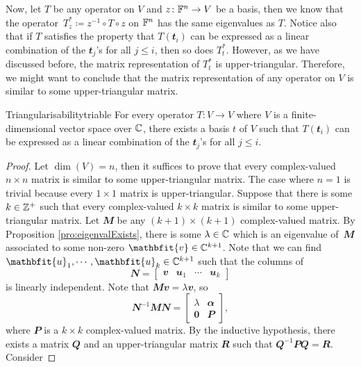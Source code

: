 \documentclass[math]{amznotes}
\theoremstyle{remark}
\newcommand{\zero}{\mathbf{0}}
\begin{document}
Now, let $T$ be any operator on $V$ and $z \colon \mathbb{F}^n \to V$ be a basis, then we know that the operator~$T^*_z \coloneqq z^{-1} \circ T \circ z$ on $\mathbb{F}^n$ has the same eigenvalues as $T$. Notice also that if $T$ satisfies the property that $T(\mathbfit{t}_i)$ can be expressed as a linear combination of the $\mathbfit{t}_j$'s for all $j \leq i$, then so does $T^*_t$. However, as we have discussed before, the matrix representation of $T^*_t$ is upper-triangular. Therefore, we might want to conclude that the matrix representation of any operator on $V$ is similar to some upper-triangular matrix.
\begin{thmbox}{Triangularisability}{triable}
    For every operator $T \colon V \to V$ where $V$ is a finite-dimensional vector space over $\mathbb{C}$, there exists a basis $t$ of $V$ such that $T(\mathbfit{t}_i)$ can be expressed as a linear combination of the $\mathbfit{t}_j$'s for all $j \leq i$.
    \tcblower
    \begin{proof}
        Let $\dim(V) = n$, then it suffices to prove that every complex-valued $n \times n$ matrix is similar to some upper-triangular matrix. The case where $n = 1$ is trivial because every $1 \times 1$ matrix is upper-triangular. Suppose that there is some $k \in \mathbb{Z}^+$ such that every complex-valued $k \times k$ matrix is similar to some upper-triangular matrix. Let $\mathbfit{M}$ be any $(k + 1) \times (k + 1)$ complex-valued matrix. By Proposition \ref{pro:eigenvalExists}, there is some $\lambda \in \mathbb{C}$ which is an eigenvalue of~$\mathbfit{M}$ associated to some non-zero $\mathbfit{v} \in \C^{k + 1}$. Note that we can find $\mathbfit{u}_1, \cdots, \mathbfit{u}_k \in \C^{k + 1}$ such that the columns of 
        \begin{equation*}
            \mathbfit{N} = \begin{bmatrix}
                \mathbfit{v} & \mathbfit{u}_1 & \cdots & \mathbfit{u}_k
            \end{bmatrix}
        \end{equation*}
        is linearly independent. Note that $\mathbfit{Mv} = \lambda\mathbfit{v}$, so
        \begin{equation*}
            \mathbfit{N}^{-1}\mathbfit{MN} = \begin{bmatrix}
                \lambda & \mathbfit{\alpha} \\
                \zero & \mathbfit{P}
            \end{bmatrix},
        \end{equation*}
        where $\mathbfit{P}$ is a $k \times k$ complex-valued matrix. By the inductive hypothesis, there exists a matrix $\mathbfit{Q}$ and an upper-triangular matrix $\mathbfit{R}$ such that $\mathbfit{Q}^{-1}\mathbfit{PQ} = \mathbfit{R}$. Consider

\end{proof}
\end{thmbox}
\end{document}
